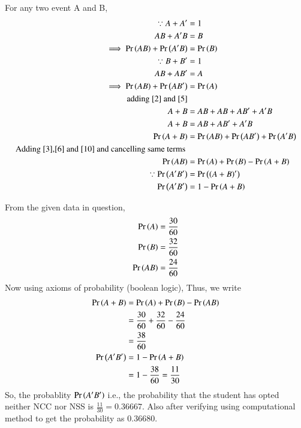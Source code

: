 \documentclass[journal]{IEEEtran}
\begin{document}
 For any two event A and B,
\begin{align}
	\because A + A^\prime &= 1 \\
	 AB + A^\prime B &= B \label{2} \\
	 \implies \Pr\left(AB\right) + \Pr\left(A^\prime B\right) &= \Pr\left(B\right) \label{3} \\
	 \because B + B^\prime &= 1 \\
	 AB + AB^\prime &= A \label{5}\\
	 \implies \Pr\left(AB\right) + \Pr\left(AB^\prime\right) &= \Pr\left(A\right) \label{6} \\
	 \text{adding } \eqref{2} \text{ and } \eqref{5} \\
	 A + B &= AB + AB + AB^\prime + A^\prime B  \\
	 A + B &= AB + AB^\prime + A^\prime B \\ 
	 \Pr\left(A + B\right) &= \Pr\left(AB\right) + \Pr\left(AB^\prime\right) + \Pr\left(A^\prime B\right) \label{10}\\
	 \text{Adding \eqref{3},\eqref{6} and \eqref{10} and cancelling same terms } \\
	 \Pr\left(AB\right) &= \Pr\left(A\right) + \Pr\left(B\right) - \Pr\left(A + B\right) \\
	 \because \Pr\left(A^\prime B^\prime\right) &=  \Pr\left(\left(A + B\right)^\prime\right) \\
	 \Pr\left(A^\prime  B^\prime\right) &=  1 - \Pr\left(A+B\right)
\end{align}



From the given data in question,
    \begin{align}
        \Pr\left(A\right) &= \frac{30}{60} \\
        \Pr\left(B\right) &= \frac{32}{60} \\
        \Pr\left(AB\right) &= \frac{24}{60}     
    \end{align}
Now using axioms of probability (boolean logic),
Thus, we write
    \begin{align}
	    \Pr\left(A + B\right) &= \Pr\left(A\right) +  \Pr\left(B\right) - \Pr\left(A B\right) \\
	                                 &= \frac{30}{60} + \frac{32}{60} - \frac{24}{60} \\
	                                 &= \frac{38}{60} \\
	     \Pr\left(A^\prime  B^\prime\right) &=  1 - \Pr\left(A+B\right) \\ 
	                              &= 1- \frac{38}{60} = \frac{11}{30} 
    \end{align} 
So, the probablity $\Pr\left(A^\prime  B^\prime\right)$ i.e., the probability that the student has opted neither NCC nor NSS is $\frac{11}{30} = 0.36667$.
Also after verifying using computational method to get the probability as 0.36680.
\end{document}

